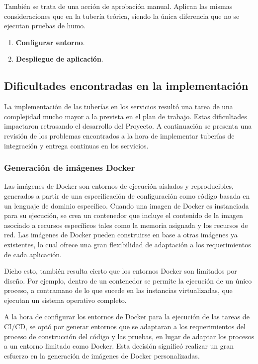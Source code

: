 También se trata de una acción de aprobación manual. Aplican las mismas consideraciones que en la tubería teórica, siendo la única diferencia que no se ejecutan pruebas de humo.

\begin{enumerate}
\item \textbf{Configurar entorno}.
\item \textbf{Despliegue de aplicación}.
\end{enumerate}
\subsection{Dificultades encontradas en la implementación}

La implementación de las tuberías en los servicios resultó una tarea de una complejidad mucho mayor a la prevista en el plan de trabajo. Estas dificultades impactaron retrasando el desarrollo del Proyecto. A continuación se presenta una revisión de los problemas encontrados a la hora de implementar tuberías de integración y entrega continuas en los servicios.

\subsubsection{Generación de imágenes Docker}

Las imágenes de Docker son entornos de ejecución aislados y reproducibles, generados a partir de una especificación de configuración como código basada en un lenguaje de dominio específico. Cuando una imagen de Docker es instanciada para su ejecución, se crea un contenedor que incluye el contenido de la imagen asociado a recursos específicos tales como la memoria asignada y los recursos de red. Las imágenes de Docker pueden construirse en base a otras imágenes ya existentes, lo cual ofrece una gran flexibilidad de adaptación a los requerimientos de cada aplicación.

Dicho esto, también resulta cierto que los entornos Docker son limitados por diseño. Por ejemplo, dentro de un contenedor se permite la ejecución de un único proceso, a contramano de lo que sucede en las instancias virtualizadas, que ejecutan un sistema operativo completo.

A la hora de configurar los entornos de Docker para la ejecución de las tareas de CI/CD, se optó por generar entornos que se adaptaran a los requerimientos del proceso de construcción del código y las pruebas, en lugar de adaptar los procesos a un entorno limitado como Docker. Esta decisión significó realizar un gran esfuerzo en la generación de imágenes de Docker personalizadas.

